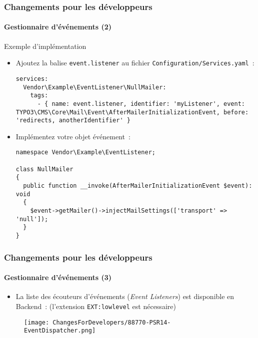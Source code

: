 \begin{frame}[fragile]
	\frametitle{Changements pour les développeurs}
	\framesubtitle{Gestionnaire d'événements (2)}

	\lstset{basicstyle=\tiny\ttfamily}

	Exemple d'implémentation

	\begin{itemize}\smaller
		\item[\ding{202}] Ajoutez la balise \texttt{event.listener} au fichier \texttt{Configuration/Services.yaml}~:

\begin{lstlisting}
services:
  Vendor\Example\EventListener\NullMailer:
    tags:
      - { name: event.listener, identifier: 'myListener', event: TYPO3\CMS\Core\Mail\Event\AfterMailerInitializationEvent, before: 'redirects, anotherIdentifier' }
\end{lstlisting}

		\item[\ding{203}] Implémentez votre objet événement~:

\begin{lstlisting}
namespace Vendor\Example\EventListener;

class NullMailer
{
  public function __invoke(AfterMailerInitializationEvent $event): void
  {
    $event->getMailer()->injectMailSettings(['transport' => 'null']);
  }
}
\end{lstlisting}

	\end{itemize}\normalsize

\end{frame}


\begin{frame}[fragile]
	\frametitle{Changements pour les développeurs}
	\framesubtitle{Gestionnaire d'événements (3)}

	\lstset{basicstyle=\tiny\ttfamily}

	\begin{itemize}
		\item La liste des écouteurs d'événements (\textit{Event Listeners}) est disponible en Backend~:\newline
			\smaller
				(l'extension \texttt{EXT:lowlevel} est nécessaire)
			\normalsize
	\end{itemize}

	\begin{figure}
		\texttt{[image: ChangesForDevelopers/88770-PSR14-EventDispatcher.png]}
	\end{figure}

\end{frame}


